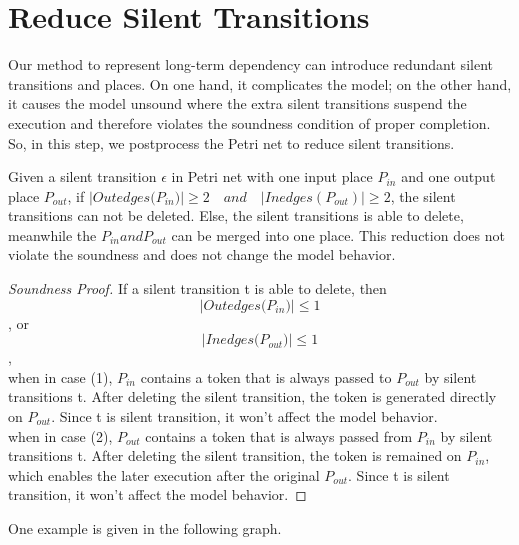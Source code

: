 \section{Reduce Silent Transitions}
Our method to represent long-term dependency  can introduce redundant silent transitions and places. On one hand, it complicates the model; on the other hand, it causes the model unsound where the extra silent transitions suspend the execution and therefore violates the soundness condition of proper completion. So, in this step, we postprocess the Petri net to reduce silent transitions.
\begin{proposition}
	Given a silent transition $\epsilon$ in Petri net with one input place $P_{in}$ and one output place $P_{out}$, if $\vert Outedges({P_{in}) }\vert \geq 2 \quad and \quad \vert Inedges(P_{out}) \vert \geq 2 $, the silent transitions can not be deleted. Else, the silent transitions is able to delete, meanwhile the $P_{in} and P_{out}$ can be merged into one place. This reduction does not violate the soundness and does not change the model behavior.
\end{proposition}
\begin{proof}[Soundness Proof]
	If a silent transition t is able to delete, then
	\[\vert Outedges({P_{in}) }\vert \leq 1	\] , or
	\[\vert Inedges({P_{out}) }\vert \leq 1	\], \\
	when in case (1), $P_{in}$ contains a token that is always passed to $P_{out}$ by silent transitions t. After deleting the silent transition, the token is generated directly on $P_{out}$. Since t is silent transition, it won't affect the model behavior. \\ 
	when in case (2), $P_{out}$ contains a token that is always passed from $P_{in}$ by silent transitions t. After deleting the silent transition, the token is remained on $P_{in}$, which enables the later execution after the original $P_{out}$. Since t is silent transition, it won't affect the model behavior. 
\end{proof}
One example is given in the following graph. 
